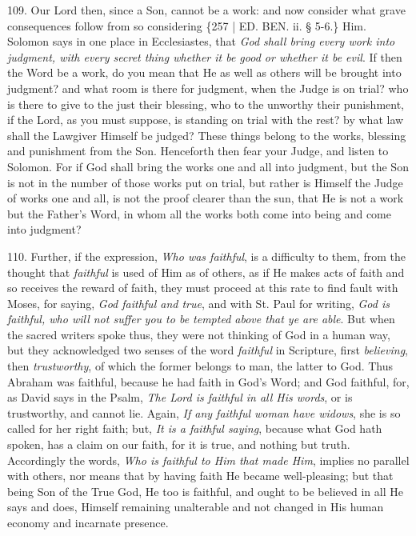 109. Our Lord then, since a
Son, cannot be a work: and now consider what grave consequences follow
from so considering \{257 | ED. BEN. ii. § 5-6.\}
Him. Solomon says in one place in Ecclesiastes, that \emph{God shall
bring every work into judgment, with every secret thing whether it be
good or whether it be evil}. If then the Word be a work, do you
mean that He as well as others will be brought into judgment? and what
room is there for judgment, when the Judge is on trial? who is there
to give to the just their blessing, who to the unworthy their
punishment, if the Lord, as you must suppose, is standing on trial
with the rest? by what law shall the Lawgiver Himself be judged? These
things belong to the works, blessing and punishment from the Son.
Henceforth then fear your Judge, and listen to Solomon. For if God
shall bring the works one and all into judgment, but the Son is not in
the number of those works put on trial, but rather is Himself the
Judge of works one and all, is not the proof clearer than the sun,
that He is not a work but the Father's Word, in whom all the works
both come into being and come into judgment?

110. Further, if the
expression, \emph{Who was faithful}, is a difficulty to them, from the
thought that \emph{faithful} is used of Him as of others, as if He
makes acts of faith and so receives the reward of faith, they must
proceed at this rate to find fault with Moses, for saying, \emph{God
faithful and true}, and with St. Paul for writing, \emph{God is
faithful, who will not suffer you to be tempted above that ye are able}.
But when the sacred writers spoke thus, they were not thinking of God
in a human way, but they acknowledged two senses of the word \emph{faithful}
in Scripture, first \emph{believing}, then \emph{trustworthy}, of
which the former belongs to man, the latter to God. Thus Abraham was
faithful, because he had faith in God's Word; and God faithful, for,
as David says in the Psalm, \emph{The Lord is faithful in all His words},
or is trustworthy, and cannot lie. Again, \emph{If any faithful woman
have widows}, she is so called for her right faith; but, \emph{It is a
faithful saying}, because what God hath spoken, has a claim on our faith, for it is true, and nothing but truth. Accordingly the
words, \emph{Who is faithful to Him that made Him}, implies no
parallel with others, nor means that by having faith He became
well-pleasing; but that being Son of the True God, He too is faithful,
and ought to be believed in all He says and does, Himself remaining
unalterable and not changed in His human economy and incarnate
presence.

